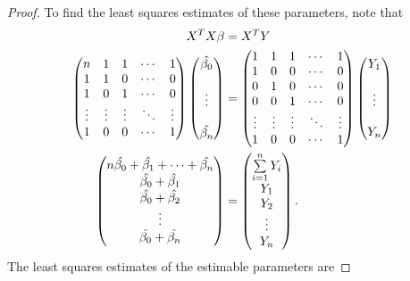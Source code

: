 \documentclass[12pt]{article}
\begin{document}
\begin{enumerate}[leftmargin=0cm,itemindent=.5cm,labelwidth=\itemindent,labelsep=0cm,align=left]
\begin{proof}
\noindent To find the least squares estimates of these parameters, note that
\begin{align*}
X^T X \beta &= X^T Y \\
\begin{pmatrix}
n & 1 & 1 & \cdots & 1 \\
1 & 1 & 0 & \cdots & 0 \\
1 & 0 & 1 & \cdots & 0 \\
\vdots & \vdots & \vdots & \ddots & \vdots \\
1 & 0 & 0 & \cdots & 1
\end{pmatrix}
\begin{pmatrix}
\hat{\beta_0} \\
\vphantom{0} \\
\vdots\\
\vphantom{0} \\
\hat{\beta_n}
\end{pmatrix}
&=
\begin{pmatrix}
1 & 1 & 1 & \cdots & 1 \\
1 & 0 & 0 & \cdots & 0 \\
0 & 1 & 0 & \cdots & 0 \\
0 & 0 & 1 & \cdots & 0 \\
\vdots & \vdots & \vdots & \ddots & \vdots \\
1 & 0 & 0 & \cdots & 1
\end{pmatrix}
\begin{pmatrix}
Y_1 \\
\vphantom{0} \\
\vdots\\
\vphantom{0} \\
Y_n
\end{pmatrix} \\
\begin{pmatrix}
n\hat{\beta_0} + \hat{\beta_1} + \cdots + \hat{\beta_n} \\
\hat{\beta_0} + \hat{\beta_1} \\
\hat{\beta_0} + \hat{\beta_2} \\
\vdots \\
\hat{\beta_0} + \hat{\beta_n}
\end{pmatrix}
&=
\begin{pmatrix}
\sum\limits_{i=1}^n Y_i \\
Y_1 \\
Y_2 \\
\vdots \\
Y_n
\end{pmatrix}.
\end{align*}
The least squares estimates of the estimable parameters are


\end{proof}
\end{enumerate}
\end{document}
